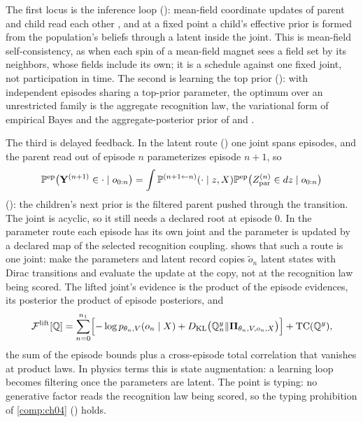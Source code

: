 The first locus is the inference loop (): mean-field coordinate updates
of parent and child read each other \citep[Sec.~10.1.1]{Bishop2006}, and at a fixed point a child's
effective prior is formed from the population's beliefs through a latent inside the joint. This is
mean-field self-consistency, as when each spin of a mean-field magnet sees a field set by its neighbors,
whose fields include its own; it is a schedule against one fixed joint, not participation in time. The
second is learning the top prior (): with independent episodes
sharing a top-prior parameter, the optimum over an unrestricted family is the aggregate recognition law,
the variational form of empirical Bayes \citep{Robbins1956} and the aggregate-posterior prior of
\citet{HoffmanJohnson2016} and \citet{TomczakWelling2018}.

The third is delayed feedback. In the latent route () one joint spans
episodes, and the parent read out of episode $n$ parameterizes episode $n+1$, so
\[
\mathbb P^{\mathrm{ep}}\bigl(\mathbf Y^{(n+1)}\in\cdot\mid o_{0:n}\bigr)
=\int\mathbb P^{(n+1\leftarrow n)}(\cdot\mid z,X)
\mathbb P^{\mathrm{ep}}\bigl(Z^{(n)}_{\mathrm{par}}\in dz\mid o_{0:n}\bigr)
\]
(): the children's next prior is the filtered parent pushed through the
transition. The joint is acyclic, so it still needs a declared root at episode $0$. In the parameter
route each episode has its own joint and the parameter is updated by a declared map of the selected
recognition coupling.  shows that such a route is one joint:
make the parameters and latent record copies $\widetilde o_n$ latent states with Dirac transitions and
evaluate the update at the copy, not at the recognition law being scored. The lifted joint's evidence is
the product of the episode evidences, its posterior the product of episode posteriors, and
\[
\mathcal F^{\mathrm{lift}}[\mathbb Q]
=\sum_{n=0}^{n_1}\Bigl[-\log p_{\theta_n,V}(o_n\mid X)
+D_{\mathrm{KL}}\bigl(\mathbb Q^{y}_n\Vert\boldsymbol\Pi_{\theta_n,V,o_n,X}\bigr)\Bigr]
+\operatorname{TC}(\mathbb Q^{y}),
\]
the sum of the episode bounds plus a cross-episode total correlation that vanishes at product laws. In
physics terms this is state augmentation: a learning loop becomes filtering once the parameters are
latent. The point is typing: no generative factor reads the recognition law being scored, so the typing
prohibition of \cref{comp:ch04} () holds.

